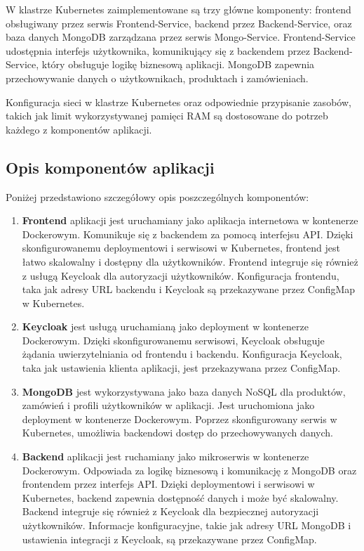 \documentclass[12pt,a4paper]{article}
\begin{document}
W klastrze Kubernetes zaimplementowane są trzy główne komponenty: frontend obsługiwany przez serwis Frontend-Service, backend przez Backend-Service, oraz baza danych MongoDB zarządzana przez serwis Mongo-Service. Frontend-Service udostępnia interfejs użytkownika, komunikujący się z backendem przez Backend-Service, który obsługuje logikę biznesową aplikacji. MongoDB zapewnia przechowywanie danych o użytkownikach, produktach i zamówieniach.

Konfiguracja sieci w klastrze Kubernetes oraz odpowiednie przypisanie zasobów, takich jak limit wykorzystywanej pamięci RAM są dostosowane do potrzeb każdego z komponentów aplikacji.

\subsection{Opis komponentów aplikacji}
\label{sec:FunctionalConditions}
Poniżej przedstawiono szczegółowy opis poszczególnych komponentów:

\begin{enumerate}
    \item\textbf{Frontend} aplikacji jest uruchamiany jako aplikacja internetowa w kontenerze Dockerowym. Komunikuje się z backendem za pomocą interfejsu API. Dzięki skonfigurowanemu deploymentowi i serwisowi w Kubernetes, frontend jest łatwo skalowalny i dostępny dla użytkowników. Frontend integruje się również z usługą Keycloak dla autoryzacji użytkowników. Konfiguracja frontendu, taka jak adresy URL backendu i Keycloak są przekazywane przez ConfigMap w Kubernetes.

    \item\textbf{Keycloak} jest usługą uruchamianą jako deployment w kontenerze Dockerowym. Dzięki skonfigurowanemu serwisowi, Keycloak obsługuje żądania uwierzytelniania od frontendu i backendu. Konfiguracja Keycloak, taka jak ustawienia klienta aplikacji, jest przekazywana przez ConfigMap.

    \item\textbf{MongoDB} jest wykorzystywana jako baza danych NoSQL dla produktów, zamówień i profili użytkowników w aplikacji. Jest uruchomiona jako deployment w kontenerze Dockerowym. Poprzez skonfigurowany serwis w Kubernetes, umożliwia backendowi dostęp do przechowywanych danych.

    \item\textbf{Backend} aplikacji jest ruchamiany jako mikroserwis w kontenerze Dockerowym. Odpowiada za logikę biznesową i komunikację z MongoDB oraz frontendem przez interfejs API. Dzięki deploymentowi i serwisowi w Kubernetes, backend zapewnia dostępność danych i może być skalowalny. Backend integruje się również z Keycloak dla bezpiecznej autoryzacji użytkowników. Informacje konfiguracyjne, takie jak adresy URL MongoDB i ustawienia integracji z Keycloak, są przekazywane przez ConfigMap.
\end{enumerate}
\end{document}
